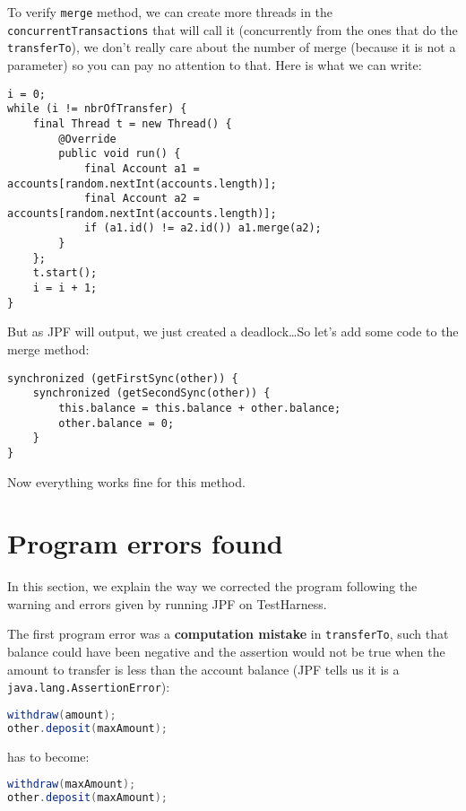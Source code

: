 \documentclass[11pt, a4paper]{article}
\begin{document}
    To verify \verb#merge# method, we can create more threads in the
    \verb#concurrentTransactions# that will call it (concurrently from the ones
    that do the \verb#transferTo#), we don't really care about the number of
    merge (because it is not a parameter) so you can pay no attention to that.
    Here is what we can write:

    \begin{lstlisting}
i = 0;
while (i != nbrOfTransfer) {
    final Thread t = new Thread() {
        @Override
        public void run() {
            final Account a1 = accounts[random.nextInt(accounts.length)];
            final Account a2 = accounts[random.nextInt(accounts.length)];
            if (a1.id() != a2.id()) a1.merge(a2);
        }
    };
    t.start();
    i = i + 1;
}
    \end{lstlisting}

    But as JPF will output, we just created a deadlock\ldots So let's add some
    code to the merge method:

    \begin{lstlisting}
synchronized (getFirstSync(other)) {
    synchronized (getSecondSync(other)) {
        this.balance = this.balance + other.balance;
        other.balance = 0;
    }
}
    \end{lstlisting}

    Now everything works fine for this method.

    \section{Program errors found}

    In this section, we explain the way we corrected the program following the
    warning and errors given by running JPF on TestHarness. \newline

    The first program error was a \textbf{computation mistake} in \verb#transferTo#,
    such that balance could have been negative and the assertion would not
    be true when the amount to transfer is less than the account balance
    (JPF tells us it is a \verb#java.lang.AssertionError#):

    \begin{lstlisting}[language=Java]
withdraw(amount);
other.deposit(maxAmount);
    \end{lstlisting}

    has to become:
    \begin{lstlisting}[language=Java]
withdraw(maxAmount);
other.deposit(maxAmount);
    \end{lstlisting}
\end{document}
